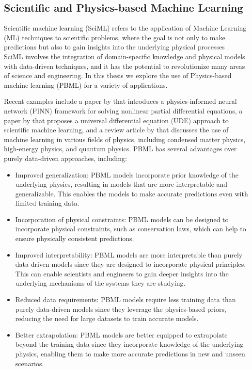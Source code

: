 \subsection{Scientific and Physics-based Machine Learning}

Scientific machine learning (SciML) refers to the application of Machine Learning (ML) techniques to scientific problems, where the goal is not only to make predictions but also to gain insights into the underlying physical processes \cite{raissi2019physics, rackauckas2020universal, carleo2019machine}. SciML involves the integration of domain-specific knowledge and physical models with data-driven techniques, and it has the potential to revolutionize many areas of science and engineering. In this thesis we explore the use of Physics-based machine learning (PBML) \cite{Raissi2021, Wu2021} for a variety of applications.

Recent examples include a paper by \cite{raissi2019physics} that introduces a physics-informed neural network (PINN) framework for solving nonlinear partial differential equations, a paper by \cite{rackauckas2020universal} that proposes a universal differential equation (UDE) approach to scientific machine learning, and a review article by \cite{carleo2019machine} that discusses the use of machine learning in various fields of physics, including condensed matter physics, high-energy physics, and quantum physics. PBML has several advantages over purely data-driven approaches, including:

\begin{itemize}
\item Improved generalization: PBML models incorporate prior knowledge of the underlying physics, resulting in models that are more interpretable and generalizable. This enables the models to make accurate predictions even with limited training data.
\item Incorporation of physical constraints: PBML models can be designed to incorporate physical constraints, such as conservation laws, which can help to ensure physically consistent predictions.
\item Improved interpretability: PBML models are more interpretable than purely data-driven models since they are designed to incorporate physical principles. This can enable scientists and engineers to gain deeper insights into the underlying mechanisms of the systems they are studying.
\item Reduced data requirements: PBML models require less training data than purely data-driven models since they leverage the physics-based priors, reducing the need for large datasets to train accurate models.
\item Better extrapolation: PBML models are better equipped to extrapolate beyond the training data since they incorporate knowledge of the underlying physics, enabling them to make more accurate predictions in new and unseen scenarios.
\end{itemize}

